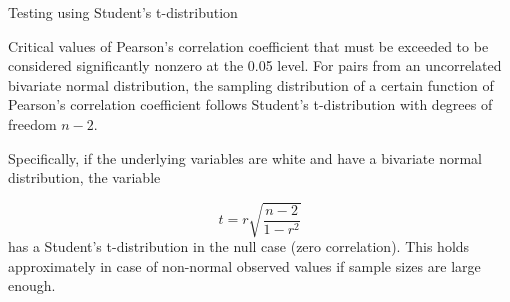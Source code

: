 

Testing using Student's t-distribution

Critical values of Pearson's correlation coefficient that must be exceeded to be considered significantly nonzero at the 0.05 level.
For pairs from an uncorrelated bivariate normal distribution, the sampling distribution of a certain function of Pearson's correlation coefficient follows Student's t-distribution with degrees of freedom $n - 2$. 

Specifically, if the underlying variables are white and have a bivariate normal distribution, the variable

\[{\displaystyle t=r{\sqrt {\frac {n-2}{1-r^{2}}}}} \]
has a Student's t-distribution in the null case (zero correlation). 
This holds approximately in case of non-normal observed values if sample sizes are large enough.